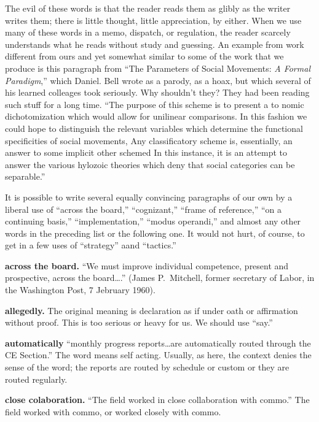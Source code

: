 \documentclass[
    oneside,
    11pt,
    draft
]{memoir}
\begin{document}
The evil of these words is that the reader reads them as glibly as the writer writes them; there is little thought, little appreciation, by either. When we use many of these words in a memo, dispatch, or regulation, the reader scarcely understands what he reads without study and guessing. An example from work different from ours and yet somewhat similar to some of the work that we produce is this paragraph from \enquote{The Parameters of Social Movements: \emph{A Formal Paradigm},} which Daniel. Bell wrote as a parody, as a hoax, but which several of his learned colleages took seriously. Why shouldn't they? They had been reading such stuff for a long time. \enquote{The purpose of this scheme is to present a to nomic dichotomization which would allow for unilinear comparisons. In this fashion we could hope to distinguish the relevant variables which determine the functional specificities of social movements, Any classificatory scheme is, essentially, an answer to some implicit other schemed In this instance, it is an attempt to answer the various hylozoic theories which deny that social categories can be separable.}

It is possible to write several equally convincing paragraphs of our own by a liberal use of \enquote{across the board,} \enquote{cognizant,} \enquote{frame of reference,} \enquote{on a continuing basis,} \enquote{implementation,} \enquote{modus operandi,} and almost any other words in the preceding list or the following one. It would not hurt, of course, to get in a few uses of \enquote{strategy} aand \enquote{tactics.}

\textbf{across the board.} \enquote{We must improve individual competence, present and prospective, across the board\dots.} (James P.\ Mitchell, former secretary of Labor, in the Washington Post, 7 Jebruary 1960).

\textbf{allegedly.} The original meaning is declaration as if under oath or affirmation without proof. This is too serious or heavy for us. We should use \enquote{say.}

\textbf{automatically} \enquote{monthly progress reports\dots are automatically routed through the CE Section.} The word means self acting. Usually, as here, the context denies the sense of the word; the reports are routed by schedule or custom or they are routed regularly.

\textbf{close colaboration.} \enquote{The field worked in close collaboration with commo.} The field worked with commo, or worked closely with commo.
\end{document}
